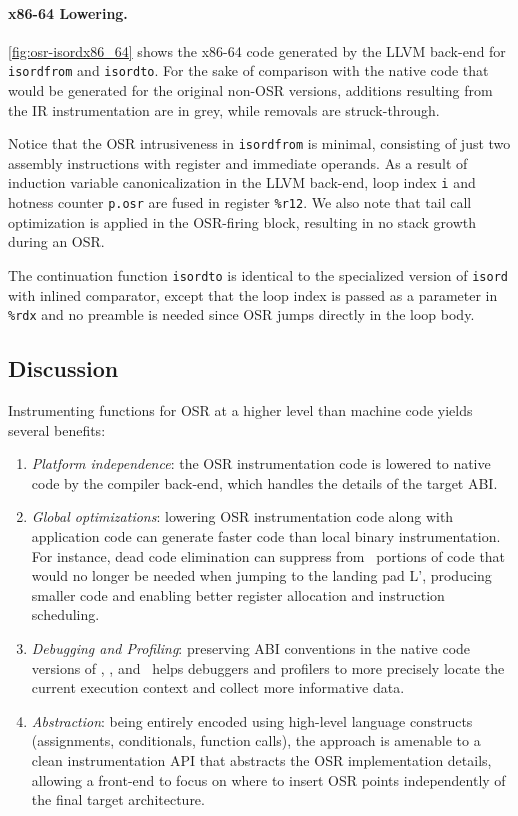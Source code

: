 \paragraph*{x86-64 Lowering.}

\myfigure\ref{fig:osr-isordx86_64} shows the x86-64 code generated by the LLVM back-end for {\tt isordfrom} and {\tt isordto}. For the sake of comparison with the native code that would be generated for the original non-OSR versions, additions resulting from the IR instrumentation are in grey, while removals are struck-through.

Notice that the OSR intrusiveness in {\tt isordfrom} is minimal, consisting of just two assembly instructions with register and immediate operands. As a result of induction variable canonicalization in the LLVM back-end, loop index {\tt i} and hotness counter {\tt p.osr} are fused in register {\tt\%r12}. We also note that tail call optimization is applied in the OSR-firing block, resulting in no stack growth during an OSR.

The continuation function {\tt isordto} is identical to the specialized version of {\tt isord} with inlined comparator, except that the loop index is passed as a parameter in {\tt \%rdx} and no %
preamble is needed since OSR jumps directly in the loop body.


\subsection{Discussion}
Instrumenting functions for OSR at a higher level than machine code yields several benefits: 
\begin{enumerate}[parsep=0pt]
\item {\em Platform independence}: the OSR instrumentation code is lowered to native code by the compiler back-end, which handles the details of the target ABI. 
\item {\em Global optimizations}: lowering OSR instrumentation code along with application code can generate faster code than local binary instrumentation. For instance, dead code elimination can suppress from \fosrto\ portions of code that would no longer be needed when jumping to the landing pad \textsf{L'}, producing smaller code and enabling better register allocation and instruction scheduling.
\item {\em Debugging and Profiling}: preserving ABI conventions in the native code versions of \fosrfrom, \fstub, and \fosrto\ helps debuggers and profilers to more precisely locate the current execution context and collect more informative data.
\item {\em Abstraction}: being entirely encoded using high-level language constructs (assignments, conditionals, function calls), the approach is amenable to a clean instrumentation API that abstracts the OSR implementation details, allowing a front-end to focus on where to insert OSR points independently of the final target architecture.
\end{enumerate}


